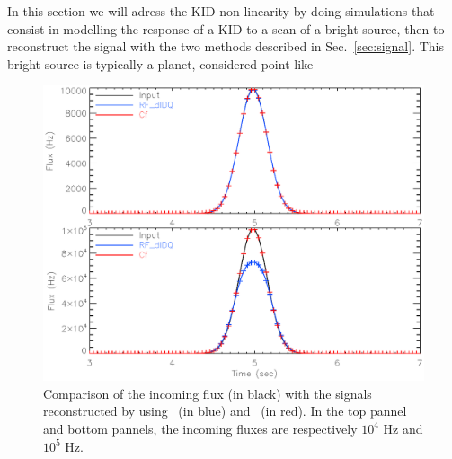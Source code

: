 In this section we will adress the KID non-linearity by doing simulations that consist in modelling the response of a KID to a scan of a bright source, then to reconstruct the signal with the two methods described in Sec.~\ref{sec:signal}. This bright source is typically a planet, considered point like 

\begin{figure}[h]
\center
\includegraphics[scale=0.55]{Figures/planets.eps}
\caption{Comparison of the incoming flux (in black) with the signals reconstructed by using \rf\ (in blue) and \cf\ (in red). In the top pannel and bottom pannels, the incoming fluxes are respectively $10^{4}$ Hz and $10^{5}$ Hz.}
\label{fig:planets}
\end{figure}

